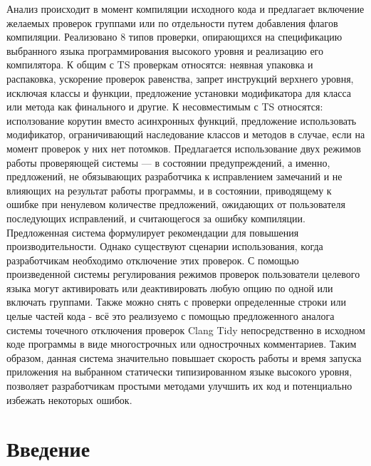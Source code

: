 \documentclass{mipt-thesis-bs}
\begin{document}
Анализ происходит в момент компиляции исходного кода и предлагает включение желаемых
проверок группами или по отдельности путем добавления флагов компиляции. Реализовано 
8 типов проверки, опирающихся на спецификацию выбранного языка
программирования высокого уровня и реализацию его компилятора. К общим с TS проверкам относятся: 
неявная упаковка и распаковка, ускорение проверок равенства, запрет инструкций верхнего уровня, исключая 
классы и функции, предложение установки модификатора для класса или метода как
финального и другие. К несовместимым с TS относятся: исползование корутин вместо асинхронных функций,
предложение использовать модификатор, ограничивающий наследование классов и методов в случае, если на
момент проверок у них нет потомков.
Предлагается использование двух режимов работы проверяющей системы — в состоянии
предупреждений, а именно, предложений, не обязывающих разработчика к исправлением замечаний и не
влияющих на результат работы программы, и в состоянии, приводящему к ошибке при ненулевом количестве 
предложений, ожидающих от пользователя последующих исправлений, и считающегося за
ошибку компиляции.
Предложенная система формулирует рекомендации для повышения производительности. Однако
существуют сценарии использования, когда разработчикам необходимо отключение этих проверок. 
С помощью произведенной системы регулирования режимов проверок пользователи целевого языка
могут активировать или деактивировать любую опцию по одной или включать группами.
Также можно снять с проверки определенные строки или целые частей кода - всё это реализуемо с помощью
предложенного аналога системы точечного отключения проверок Clang Tidy непосредственно
в исходном коде программы в виде многострочных или однострочных комментариев.
Таким образом, данная система значительно повышает скорость работы и время запуска
приложения на выбранном статически типизированном языке высокого уровня, позволяет разработчикам 
простыми методами улучшить их код и потенциально избежать некоторых ошибок.

\mainmatter


\chapter{Введение}
\end{document}
